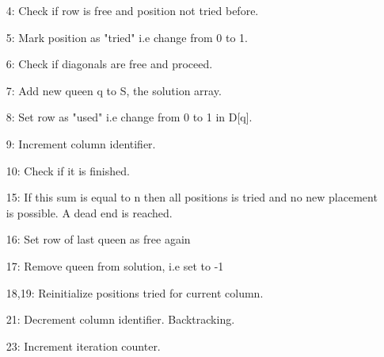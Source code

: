 \documentclass{article}
\begin{document}
\begin{enumerate}
    \item [4:] Check if row is free and position not tried before.
    \item [5:] Mark position as "tried" i.e change from 0 to 1.
    \item [6:] Check if diagonals are free and proceed.
    \item [7:] Add new queen q to S, the solution array.
    \item [8:] Set row as "used" i.e change from 0 to 1 in D[q].
    \item [9:] Increment column identifier.
    \item [10:] Check if it is finished.
    \item [15:] If this sum is equal to n then all positions is tried and 
                no new placement is possible. A dead end is reached.
    \item [16:] Set row of last queen as free again
    \item [17:] Remove queen from solution, i.e set to -1
    \item [18,19:] Reinitialize positions tried for current column. 
    \item [21:] Decrement column identifier. Backtracking.
    \item [23:] Increment iteration counter.
\end{enumerate}
\end{document}
